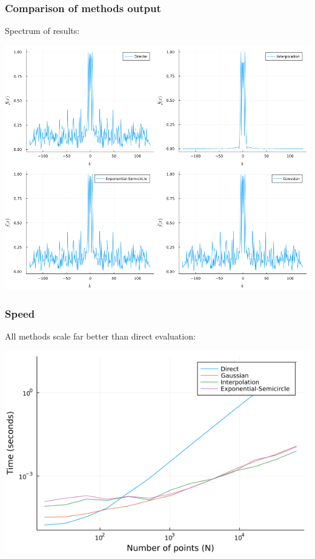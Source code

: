 \documentclass{beamer}
\begin{document}
\begin{frame}
  \frametitle{Comparison of methods output}
  Spectrum of results:

  \vfill

  \centering \includegraphics[width=.8\textwidth]{images/spectrum.png}

\end{frame}

\begin{frame}
  \frametitle{Speed}
  All methods scale far better than direct evaluation:

  \vfill

  \centering \includegraphics[width=.8\textwidth]{images/n_vs_time.png}

\end{frame}

\end{document}
